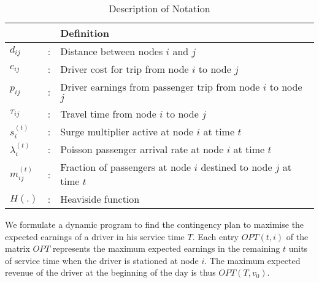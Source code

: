 \begin {table}[h]
\caption {Description of Notation} 
\label{tab:notation} 
\centering
\begin{tabular}{l c p{}}
\toprule
       &                  & Definition \\
\midrule
$d_{ij}$&:& Distance between nodes $i$ and $j$  \\
$c_{ij}$&:& Driver cost for trip from node $i$ to node $j$ \\
$p_{ij}$&:& Driver earnings from passenger trip from node $i$ to node $j$ \\
$\tau_{ij}$&:& Travel time from node $i$ to node $j$  \\
$s_{i}^{(t)}$&:& Surge multiplier active at node $i$ at time $t$ \\
$\lambda_{i}^{(t)}$&:& Poisson passenger arrival rate at node $i$ at time $t$ \\
$m_{ij}^{(t)}$&:& Fraction of passengers at node $i$ destined to node $j$ at time $t$ \\
$H(.)$&:& Heaviside function \\
\bottomrule
\end{tabular}
\end {table}


We formulate a dynamic program to find the contingency plan to maximise the expected earnings of a driver in his service time $T$. Each entry $OPT(t,i)$ of the matrix $OPT$ represents the maximum expected earnings in the remaining $t$ units of service time when the driver is stationed at node $i$. The maximum expected revenue of the driver at the beginning of the day is thus $OPT(T, v_0)$.

